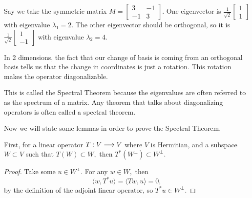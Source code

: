 \begin{example}
    Say we take the symmetric matrix $M = \begin{bmatrix} 3 & -1 \\ -1 & 3 \end{bmatrix}$.
    One eigenvector is $\frac{1}{\sqrt{2}}\begin{bmatrix}1 \\ 1 \end{bmatrix}$ with eigenvalue $\lambda_1 = 2$. 
    The other eigenvector should be orthogonal, so it is $\frac{1}{\sqrt{2}}\begin{bmatrix}1 \\ -1 \end{bmatrix}$ with eigenvalue $\lambda_2 = 4$.

    In 2 dimensions, the fact that our change of basis is coming from an orthogonal basis tells us that the change in coordinates is just a rotation. 
    This rotation makes the operator diagonalizable. 
\end{example}
This is called the Spectral Theorem because the eigenvalues are often referred to as the spectrum of a matrix. 
Any theorem that talks about diagonalizing operators is often called a spectral theorem. 

Now we will state some lemmas in order to prove the Spectral Theorem.
\begin{lemma}[Lemma 1]
First, for a linear operator $T: V \longrightarrow V$ where $V$ is Hermitian, and a subspace $W \subset V$ such that $T(W) \subset W,$ then $T^*(W^\perp) \subset W^{\perp}.$
\end{lemma}
\begin{proof}
Take some $u \in W^\perp.$ For any $w \in W,$ then 
\[
\langle w, T^*u \rangle = \langle Tw, u\rangle = 0,
\]
by the definition of the adjoint linear operator, so $T^*u \in W^\perp.$
\end{proof}

